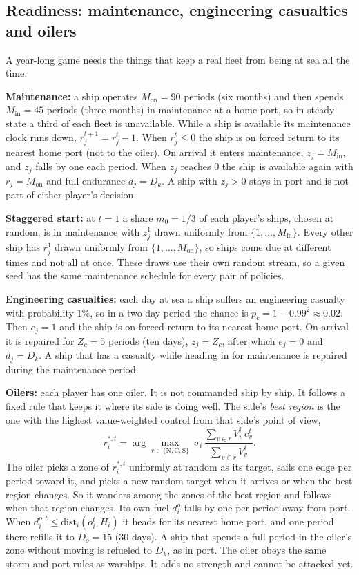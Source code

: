 \begin{addblock}
\subsection{Readiness: maintenance, engineering casualties and oilers}\label{sec:readiness}
A year-long game needs the things that keep a real fleet from being at sea all the time.

\textbf{Maintenance:} a ship operates $M_{\text{on}}=90$ periods (six months) and then spends $M_{\text{in}}=45$
periods (three months) in maintenance at a home port, so in steady state a third of each fleet is unavailable.
While a ship is available its maintenance clock runs down, $r^{t+1}_j=r^t_j-1$. When $r^t_j\le0$ the ship is on
forced return to its nearest home port (not to the oiler). On arrival it enters maintenance, $z_j=M_{\text{in}}$, and
$z_j$ falls by one each period. When $z_j$ reaches $0$ the ship is available again with $r_j=M_{\text{on}}$ and full
endurance $d_j=D_k$. A ship with $z_j>0$ stays in port and is not part of either player's decision.

\textbf{Staggered start:} at $t=1$ a share $m_0=1/3$ of each player's ships, chosen at random, is in maintenance with
$z^1_j$ drawn uniformly from $\{1,\dots,M_{\text{in}}\}$. Every other ship has $r^1_j$ drawn uniformly from
$\{1,\dots,M_{\text{on}}\}$, so ships come due at different times and not all at once. These draws use their own
random stream, so a given seed has the same maintenance schedule for every pair of policies.

\textbf{Engineering casualties:} each day at sea a ship suffers an engineering casualty with probability $1\%$, so
in a two-day period the chance is $p_c=1-0.99^2\approx0.02$. Then $e_j=1$ and the ship is on forced return to its
nearest home port. On arrival it is repaired for $Z_c=5$ periods (ten days), $z_j=Z_c$, after which $e_j=0$ and
$d_j=D_k$. A ship that has a casualty while heading in for maintenance is repaired during the maintenance period.

\textbf{Oilers:} each player has one oiler. It is not commanded ship by ship. It follows a fixed rule that keeps it
where its side is doing well. The side's \emph{best region} is the one with the highest value-weighted control from
that side's point of view,
\[
r^{*,t}_i=\arg\max_{r\in\{\text{N},\text{C},\text{S}\}}\ \sigma_i\,\frac{\sum_{v\in r}V^i_v\,c^t_v}{\sum_{v\in r}V^i_v}.
\]
The oiler picks a zone of $r^{*,t}_i$ uniformly at random as its target, sails one edge per period toward it, and
picks a new random target when it arrives or when the best region changes. So it wanders among the zones of the
best region and follows when that region changes. Its own fuel $d^{o}_i$ falls by one per period away from port.
When $d^{o,t}_i\le\mathrm{dist}_i(o^t_i,H_i)$ it heads for its nearest home port, and one period there refills it to
$D_o=15$ (30 days). A ship that spends a full period in the oiler's zone without moving is refueled to $D_k$, as
in port. The oiler obeys the same storm and port rules as warships. It adds no strength and cannot be attacked yet.
\end{addblock}
